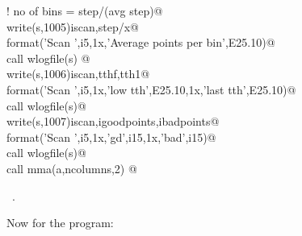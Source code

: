 \documentclass[10pt,a4paper,notitlepage]{article}
\begin{document}
\begin{flushleft}
\begin{minipage}{\linewidth}
\begin{list}{}{}
\mbox{}\verb@! no of bins = step/(avg step)@\\
\mbox{}\verb@      write(s,1005)iscan,step/x@\\
\mbox{}  format('Scan ',i5,1x,'Average points per bin',E25.10)@\\
\mbox{}\verb@      call wlogfile(s)                                                     @\\
\mbox{}\verb@      write(s,1006)iscan,tthf,tth1@\\
\mbox{}  format('Scan ',i5,1x,'low tth',E25.10,1x,'last tth',E25.10)@\\
\mbox{}\verb@      call wlogfile(s)@\\
\mbox{}\verb@      write(s,1007)iscan,igoodpoints,ibadpoints@\\
\mbox{}  format('Scan ',i5,1x,'gd',i15,1x,'bad',i15)@\\
\mbox{}\verb@      call wlogfile(s)@\\
\mbox{}\verb@      call mma(a,ncolumns,2)                                           @{\NWsep}
\end{list}
\vspace{-1.5ex}
\footnotesize
\begin{list}{}{\setlength{\itemsep}{-\parsep}\setlength{\itemindent}{-\leftmargin}}
\item \NWtxtMacroRefIn\ .

\item{}
\end{list}
\end{minipage}\vspace{4ex}
\end{flushleft}
Now for the program:
\end{document}
